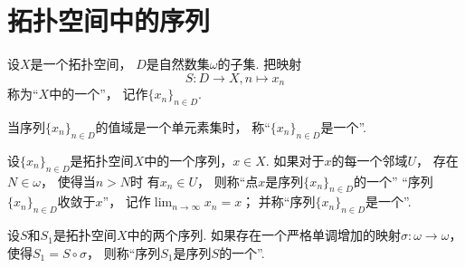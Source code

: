 \section{拓扑空间中的序列}
\begin{definition}
设\(X\)是一个拓扑空间，
\(D\)是自然数集\(\omega\)的子集.
把映射\[
	S\colon D \to X, n \mapsto x_n
\]称为“\(X\)中的一个”，
记作\(\{x_n\}_{n \in D}\).
\end{definition}

当序列\(\{x_n\}_{n \in D}\)的值域是一个单元素集时，
称“\(\{x_n\}_{n \in D}\)是一个”.

\begin{definition}
设\(\{x_n\}_{n \in D}\)是拓扑空间\(X\)中的一个序列，\(x \in X\).
如果对于\(x\)的每一个邻域\(U\)，
存在\(N \in \omega\)，
使得当\(n > N\)时
有\(x_n \in U\)，
则称“点\(x\)是序列\(\{x_n\}_{n \in D}\)的一个”
“序列\(\{x_n\}_{n \in D}\)收敛于\(x\)”，
记作\(\lim_{n\to\infty} x_n = x\)；
并称“序列\(\{x_n\}_{n \in D}\)是一个”.
\end{definition}

\begin{definition}
设\(S\)和\(S_1\)是拓扑空间\(X\)中的两个序列.
如果存在一个严格单调增加的映射\(\sigma\colon \omega \to \omega\)，
使得\(S_1 = S \circ \sigma\)，
则称“序列\(S_1\)是序列\(S\)的一个”.
\end{definition}
